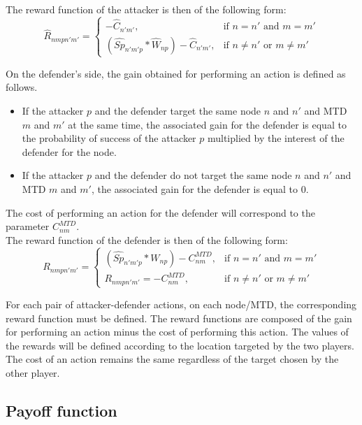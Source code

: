 The reward function of the attacker is then of the following form: 
\begin{equation}
  \widehat{R}_{nmpn'm'} = \begin{cases}
  -\widehat{C}_{n'm'}, & \text{if } n = n' \text{ and } m = m' 
  \\
  (\widehat{Sp}_{n'm'p} * \widehat{W}_{np}) - \widehat{C}_{n'm'}, & \text{if } n \neq n' \text{ or } m \neq m'
  \end{cases}
\end{equation}
\newline

On the defender's side, the gain obtained for performing an action is defined as follows. 
\begin{itemize}
    \item If the attacker $p$ and the defender target the same node $n$ and $n'$ and MTD $m$ and $m'$ at the same time, the associated gain for the defender is equal to the probability of success of the attacker $p$ multiplied by the interest of the defender for the node.
    \item If the attacker $p$ and the defender do not target the same node $n$ and $n'$ and MTD $m$ and $m'$, the associated gain for the defender is equal to 0. 
\end{itemize}
The cost of performing an action for the defender will correspond to the parameter $C^{MTD}_{nm}$. \\

The reward function of the defender is then of the following form:
\begin{equation}
  R_{nmpn'm'} = \begin{cases}
  (\widehat{Sp}_{n'm'p} * W_{np}) - C^{MTD}_{nm}, & \text{if } n = n' \text{ and } m = m' 
  \\
  R_{nmpn'm'} =  - C^{MTD}_{nm}, & \text{if } n \neq n' \text{ or } m \neq m' 
 \end{cases} 
\end{equation}


For each pair of attacker-defender actions, on each node/MTD, the corresponding reward function must be defined. The reward functions are composed of the gain for performing an action minus the cost of performing this action. The values of the rewards will be defined according to the location targeted by the two players. The cost of an action remains the same regardless of the target chosen by the other player.
\newline

\subsection{Payoff function}

